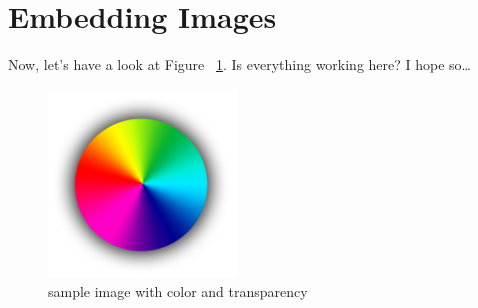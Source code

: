 \documentclass[a4paper,12pt]{scrartcl}
\begin{document}
	\section{Embedding Images}
	Now, let's have a look at Figure ~\ref{myfig}. Is everything working here? I hope so…
	\begin{figure}[h]
	    \centering
	    \includegraphics[width=50mm]{images/sample_image.png}
	    \caption{sample image with color and transparency}
		\label{myfig}
	\end{figure}
\end{document}
